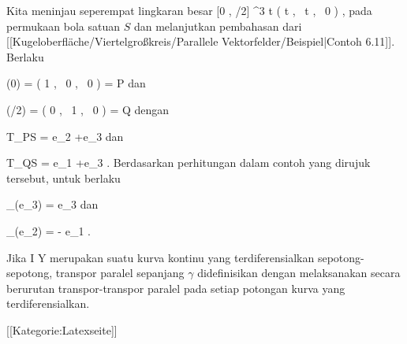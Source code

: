 {

Kita meninjau seperempat lingkaran besar
\maabbeledisp {} {[0 , \pi/2] } { \R^3
} { t } { \left(  \cos  t   , \,   \sin  t  , \,   0                 \right)
} {,}
pada permukaan bola satuan $S$ dan melanjutkan pembahasan dari
[[Kugeloberfläche/Viertelgroßkreis/Parallele Vektorfelder/Beispiel|Contoh 6.11]].
Berlaku

\mavergleichskette
{\vergleichskette
{ \gamma(0)
}
{ = }{ \left(  1   , \,   0  , \,   0                 \right)
}
{ = }{ P
}
{    }{
}
{   }{
}
}
{}{}{}
dan

\mavergleichskette
{\vergleichskette
{ \gamma(\pi/2)
}
{ = }{ \left(  0   , \,   1  , \,   0                 \right)
}
{ = }{ Q
}
{    }{
}
{   }{
}
}
{}{}{}
dengan

\mavergleichskette
{\vergleichskette
{ T_PS
}
{ = }{ \R e_2 +\R e_3
}
{  }{
}
{    }{
}
{   }{
}
}
{}{}{}
dan

\mavergleichskette
{\vergleichskette
{ T_QS
}
{ = }{ \R e_1 +\R e_3
}
{  }{
}
{    }{
}
{   }{
}
}
{}{}{.}
Berdasarkan perhitungan dalam contoh yang dirujuk tersebut, untuk
berlaku

\mavergleichskette
{\vergleichskette
{ \Psi_\gamma(e_3)
}
{ = }{ e_3
}
{  }{
}
{    }{
}
{   }{
}
}
{}{}{}
dan

\mavergleichskette
{\vergleichskette
{ \Psi_\gamma(e_2)
}
{ = }{ - e_1
}
{  }{
}
{    }{
}
{   }{
}
}
{}{}{.}

}

Jika
\maabbdisp {\gamma} { I } { Y
} {}
merupakan suatu kurva kontinu yang terdiferensialkan sepotong-sepotong, transpor paralel sepanjang $\gamma$ didefinisikan dengan melaksanakan secara berurutan transpor-transpor paralel pada setiap potongan kurva yang terdiferensialkan.

 [[Kategorie:Latexseite]]
